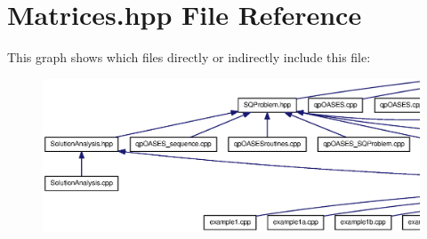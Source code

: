 \section{Matrices.hpp File Reference}
\label{Matrices_8hpp}
This graph shows which files directly or indirectly include this file:
\nopagebreak
\begin{figure}[H]
\begin{center}
\leavevmode
\includegraphics[width=400pt]{Matrices_8hpp__dep__incl}
\end{center}
\end{figure}
